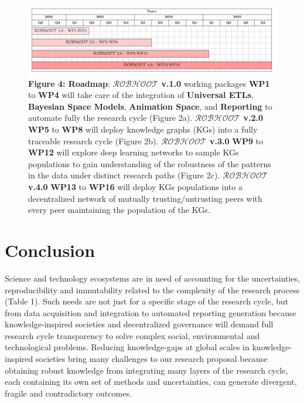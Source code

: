 \documentclass[10pt, a4paper, twocolumn]{article} %
\begin{document}
{\begin{figure}[ht]
  \includegraphics[width=1\textwidth]{GanttChartWhitePaper.pdf}
  {\small {\bf Figure 4: Roadmap}: {\bf $\mathcal{ROBHOOT}$ v.1.0}
    working packages {\bf WP1} to {\bf WP4} will take care of the
    integration of {\bf Universal ETLs}, {\bf Bayesian Space Models},
    {\bf Animation Space}, and {\bf Reporting} to automate fully the
    research cycle (Figure 2a). {\bf $\mathcal{ROBHOOT}$ v.2.0} {\bf
      WP5} to {\bf WP8} will deploy knowledge graphs (KGs) into a
    fully traceable research cycle (Figure 2b). {\bf
      $\mathcal{ROBHOOT}$ v.3.0} {\bf WP9} to {\bf WP12} will explore
    deep learning networks to sample KGs populations to gain
    understanding of the robustness of the patterns in the data under
    distinct research paths (Figure 2c). {\bf $\mathcal{ROBHOOT}$
      v.4.0} {\bf WP13} to {\bf WP16} will deploy KGs populations into
    a decentralized network of mutually trusting/untrusting peers with
    every peer maintaining the population of the KGs.}
\end{figure}


\section{Conclusion}
Science and technology ecosystems are in need of accounting for the
uncertainties, reproducibility and immutability related to the
complexity of the research process (Table 1). Such needs are not just
for a specific stage of the research cycle, but from data acquisition
and integration to automated reporting generation because
knowledge-inspired societies and decentralized governance will demand
full research cycle transparency to solve complex social,
environmental and technological problems. Reducing knowledge-gaps at
global scales in knowledge-inspired societies bring many challenges to
our research proposal because obtaining robust knowledge from
integrating many layers of the research cycle, each containing its own
set of methods and uncertainties, can generate divergent, fragile and
contradictory outcomes.

}
\end{document}

